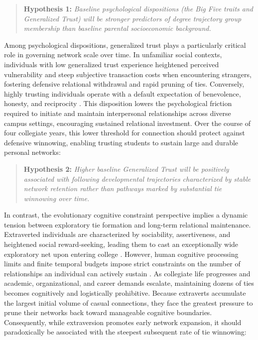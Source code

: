 \documentclass[12pt]{article}
\begin{document}
\begin{quote}
\textbf{Hypothesis 1:} \emph{Baseline psychological dispositions (the Big Five traits and Generalized Trust) will be stronger predictors of degree trajectory group membership than baseline parental socioeconomic background.}
\end{quote}

Among psychological dispositions, generalized trust plays a particularly critical role in governing network scale over time. In unfamiliar social contexts, individuals with low generalized trust experience heightened perceived vulnerability and steep subjective transaction costs when encountering strangers, fostering defensive relational withdrawal and rapid pruning of ties. Conversely, highly trusting individuals operate with a default expectation of benevolence, honesty, and reciprocity \citep{glaeser2000measuring, yamagishi2011trust}. This disposition lowers the psychological friction required to initiate and maintain interpersonal relationships across diverse campus settings, encouraging sustained relational investment. Over the course of four collegiate years, this lower threshold for connection should protect against defensive winnowing, enabling trusting students to sustain large and durable personal networks:

\begin{quote}
\textbf{Hypothesis 2:} \emph{Higher baseline Generalized Trust will be positively associated with following developmental trajectories characterized by stable network retention rather than pathways marked by substantial tie winnowing over time.}
\end{quote}

In contrast, the evolutionary cognitive constraint perspective implies a dynamic tension between exploratory tie formation and long-term relational maintenance. Extraverted individuals are characterized by sociability, assertiveness, and heightened social reward-seeking, leading them to cast an exceptionally wide exploratory net upon entering college \citep{asendorpf1998personality, costa1992four, harris2016friendship}. However, human cognitive processing limits and finite temporal budgets impose strict constraints on the number of relationships an individual can actively sustain \citep{dunbar1992neocortex, saramaki2014persistence}. As collegiate life progresses and academic, organizational, and career demands escalate, maintaining dozens of ties becomes cognitively and logistically prohibitive. Because extraverts accumulate the largest initial volume of casual connections, they face the greatest pressure to prune their networks back toward manageable cognitive boundaries. Consequently, while extraversion promotes early network expansion, it should paradoxically be associated with the steepest subsequent rate of tie winnowing:
\end{document}
